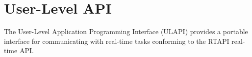 \hypertarget{group___u_l_a_p_i}{
\section{User-\/Level API}
\label{group___u_l_a_p_i}
}
The User-\/Level Application Programming Interface (ULAPI) provides a portable interface for communicating with real-\/time tasks conforming to the RTAPI real-\/time API. 